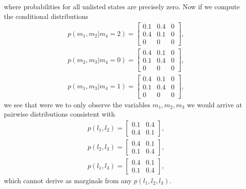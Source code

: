 where probabilities for all unlisted states are precisely zero. Now if we compute the conditional distributions
\begin{align*}
p(m_1,m_2|m_4=2) = \begin{bmatrix}
0.1 & 0.4 & 0\\
0.4 & 0.1 & 0\\
0 & 0 & 0
\end{bmatrix},\\
p(m_2,m_3|m_4=0) = \begin{bmatrix}
0.4 & 0.1 & 0\\
0.1 & 0.4 & 0\\
0 & 0 & 0
\end{bmatrix},\\
p(m_1,m_3|m_4=1) = \begin{bmatrix}
0.4 & 0.1 & 0\\
0.1 & 0.4 & 0\\
0 & 0 & 0
\end{bmatrix},
\end{align*}
we see that were we to only observe the variables $m_1,m_2,m_3$ we would arrive at pairwise distributions consistent with
\begin{align*}
p(l_1,l_2) = \begin{bmatrix}
0.1 & 0.4\\
0.4 & 0.1
\end{bmatrix},\\
p(l_2,l_3) = \begin{bmatrix}
0.4 & 0.1\\
0.1 & 0.4
\end{bmatrix},\\
p(l_1,l_3) = \begin{bmatrix}
0.4 & 0.1\\
0.1 & 0.4
\end{bmatrix},
\end{align*}
which cannot derive as marginals from any $p(l_1,l_2,l_3)$.





\FloatBarrier


